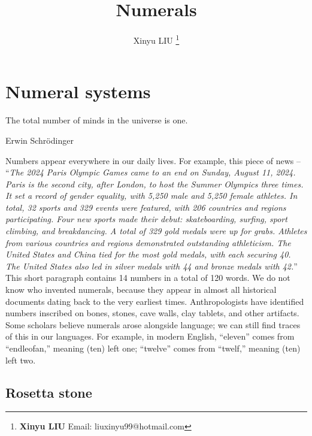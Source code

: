 \documentclass[b5paper]{article}
\begin{document}
\title{Numerals}

\author{Xinyu LIU
\thanks{{\bfseries Xinyu LIU} \newline
  Email: liuxinyu99@hotmail.com \newline}
  }

\maketitle
\fi


\ifx\wholebook\relax
\chapter{Numeral systems}
\fi

\epigraph{The total number of minds in the universe is one.}{Erwin Schrödinger}

Numbers appear everywhere in our daily lives. For example, this piece of news -- \enquote{\textit{The 2024 Paris Olympic Games came to an end on Sunday, August 11, 2024. Paris is the second city, after London, to host the Summer Olympics three times. It set a record of gender equality, with 5,250 male and 5,250 female athletes. In total, 32 sports and 329 events were featured, with 206 countries and regions participating. Four new sports made their debut: skateboarding, surfing, sport climbing, and breakdancing. A total of 329 gold medals were up for grabs. Athletes from various countries and regions demonstrated outstanding athleticism. The United States and China tied for the most gold medals, with each securing 40. The United States also led in silver medals with 44 and bronze medals with 42.}} This short paragraph contains 14 numbers in a total of 120 words. We do not know who invented numerals, because they appear in almost all historical documents dating back to the very earliest times. Anthropologists have identified numbers inscribed on bones, stones, cave walls, clay tablets, and other artifacts. Some scholars believe numerals arose alongside language; we can still find traces of this in our languages. For example, in modern English, \enquote{eleven} comes from \enquote{endleofan,} meaning (ten) left one; \enquote{twelve} comes from \enquote{twelf,} meaning (ten) left two.

\section{Rosetta stone}
  \label{sec:rosetta-stone}
\end{document}
